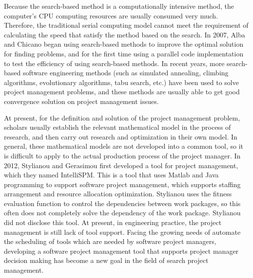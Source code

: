 Because the search-based method is a computationally intensive method,
the computer's CPU computing resources are usually consumed very
much. Therefore, the traditional serial computing model cannot meet
the requirement of calculating the speed that satisfy the method based
on the search. In 2007, Alba and Chicano began using search-based
methods to improve the optimal solution for finding problems, and for
the first time using a parallel code implementation to test the
efficiency of using search-based methods\cite{pospichal}.  In recent
years, more search-based software engineering methods (such as
simulated annealing, climbing algorithms, evolutionary algorithms,
tabu search, etc.) have been used to solve project management
problems, and these methods are usually able to get good convergence
solution on project management issues.

At present, for the definition and solution of the project management
problem, scholars usually establish the relevant mathematical model in
the process of research, and then carry out research and optimization
in their own model. In general, these mathematical models are not
developed into a common tool, so it is difficult to apply to the
actual production process of the project manager. In 2012, Stylianou
and Gerasimou first developed a tool for project management, which
they named IntelliSPM\cite{stylianou}. This is a tool that uses Matlab
and Java programming to support software project management, which
supports staffing arrangement and resource allocation
optimization. Stylianou uses the fitness evaluation function to
control the dependencies between work packages, so this often does not
completely solve the dependency of the work package. Stylianou did not
disclose this tool.  At present, in engineering practice, the project
management is still lack of tool support. Facing the growing needs of
automate the scheduling of tools which are needed by software project
managers, developing a software project management tool that supports
project manager decision making has become a new goal in the field of
search project management.

